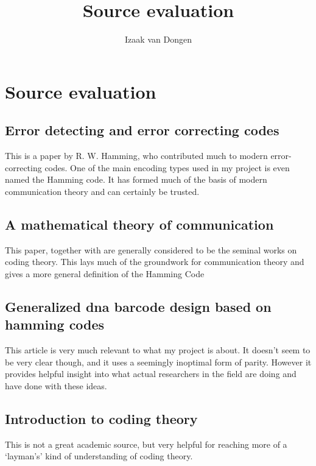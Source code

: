 \documentclass{article}
\title{Source evaluation}
\author{Izaak van Dongen}
\begin{document}
    \maketitle
    \tableofcontents

    \section{Source evaluation}
    \subsection{Error detecting and error correcting codes \cite{Hamming}}

    This is a paper by R. W. Hamming, who contributed much to modern
    error-correcting codes. One of the main encoding types used in my project
    is even named the Hamming code. It has formed much of the basis of modern
    communication theory and can certainly be trusted.

    \subsection{A mathematical theory of communication \cite{Shannon}}

    This paper, together with \cite{Hamming} are generally considered to be the
    seminal works on coding theory. This lays much of the groundwork for
    communication theory and gives a more general definition of the Hamming
    Code

    \subsection{Generalized dna barcode design based on hamming codes \cite{HammingBarcodes}}

    This article is very much relevant to what my project is about. It doesn't
    seem to be very clear though, and it uses a seemingly inoptimal form of
    parity. However it provides helpful insight into what actual researchers in
    the field are doing and have done with these ideas.

    \subsection{Introduction to coding theory \cite{CodeIntro}}

    This is not a great academic source, but very helpful for reaching more of
    a `layman's' kind of understanding of coding theory.

{}

\end{document}
